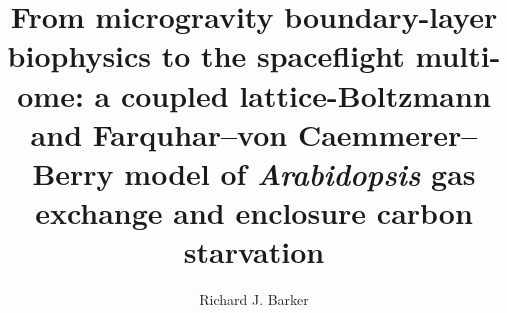 \documentclass[preprint,11pt,numbers,sort&compress]{elsarticle}
\begin{document}
\sloppy

\begin{frontmatter}

\title{From microgravity boundary-layer biophysics to the spaceflight multi-ome: a coupled lattice-Boltzmann and Farquhar--von Caemmerer--Berry model of \textit{Arabidopsis} gas exchange and enclosure carbon starvation}

\author[purdue]{Richard J. Barker}


\begin{abstract}

\end{abstract}
\end{frontmatter}
\end{document}
